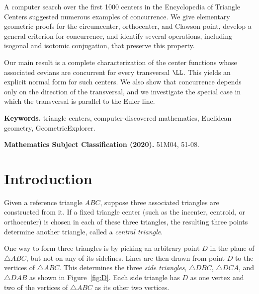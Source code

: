 \documentclass[12pt,a4paper]{amsart}
\theoremstyle{remark}
\begin{document}
A computer search over the first 1000 centers in the Encyclopedia of Triangle
Centers suggested numerous examples of concurrence. We give elementary geometric
proofs for the circumcenter, orthocenter, and Clawson point, develop a general
criterion for concurrence, and identify several operations, including isogonal
and isotomic conjugation, that preserve this property.

Our main result is a complete characterization of the center functions whose
associated cevians are concurrent for every transversal $\LL$. This yields
an explicit normal form for such centers. We also show
that concurrence depends only on the direction of the transversal, and we
investigate the special case in which the transversal is parallel to the Euler
line.


\bigskip
\textbf{Keywords.} triangle centers, computer-discovered mathematics,
Euclidean geometry, GeometricExplorer.

\medskip
\textbf{Mathematics Subject Classification (2020).} 51M04, 51-08.

\newcommand{\ru}{\rule[-8pt]{0pt}{20pt}}

\newcommand{\red}[1]{\textcolor{red}{#1}}

\newenvironment{code}[2]
{
\medskip
\hspace{#1}%
\begin{minipage}{#2}
\color{blue}
}
{
\color{black}
\smallskip
\end{minipage}%
}


\bigskip
\bigskip
%
\section{Introduction}
\label{section:introduction}

Given a reference triangle $ABC$, suppose three associated triangles are constructed from it.
If a fixed triangle center (such as the incenter, centroid, or orthocenter) is chosen in each of these three triangles,
the resulting three points determine another triangle, called a \emph{central triangle}.

One way to form three triangles is by picking an arbitrary point $D$ in the plane of $\triangle ABC$,
but not on any of its sidelines. Lines are then drawn from point $D$ to the vertices of $\triangle ABC$.
This determines the three \emph{side triangles}, $\triangle DBC$,
$\triangle DCA$, and $\triangle DAB$ as shown in Figure~\ref{fig:D}.
Each side triangle has $D$ as one vertex and two of the vertices of $\triangle ABC$
as its other two vertices.
\end{document}
